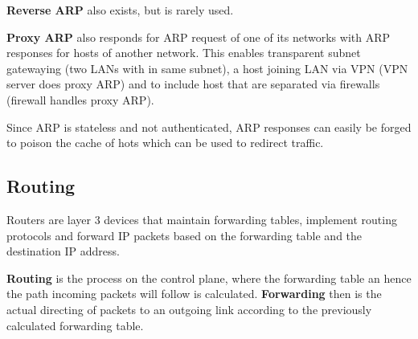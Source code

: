 \textbf{Reverse ARP} also exists, but is rarely used.

\textbf{Proxy ARP} also responds for ARP request of one of its networks with ARP responses for hosts of another network.
This enables transparent subnet gatewaying (two LANs with in same subnet), a host joining LAN via VPN (VPN server does proxy ARP) and to include host that are separated via firewalls (firewall handles proxy ARP).
\vspace{5pt}

Since ARP is stateless and not authenticated, ARP responses can easily be forged to poison the cache of hots which can be used to redirect traffic.

\subsection{Routing}
Routers are layer 3 devices that maintain forwarding tables, implement routing protocols and forward IP packets based on the forwarding table and the destination IP address.

\textbf{Routing} is the process on the control plane, where the forwarding table an hence the path incoming packets will follow is calculated.
\textbf{Forwarding} then is the actual directing of packets to an outgoing link according to the previously calculated forwarding table.
